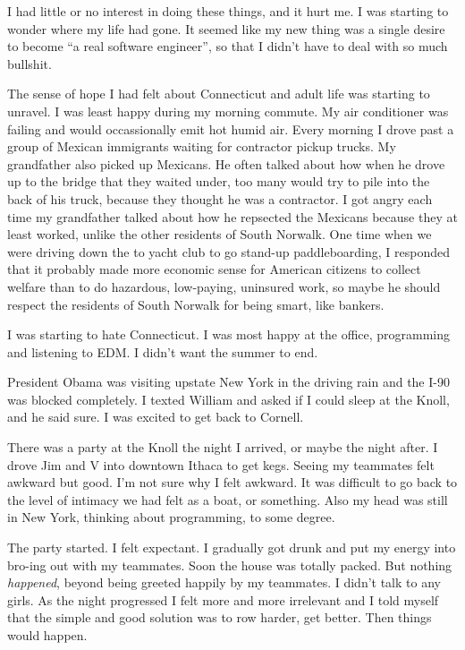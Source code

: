 \documentclass[12pt]{article}
\begin{document}
I had little or no interest in doing these things, and it hurt me.  I was
starting to wonder where my life had gone.  It seemed like my new thing was
a single desire to become ``a real software engineer'', so that I didn't have to
deal with so much bullshit.  

The sense of hope I had felt about Connecticut and adult life was starting to
unravel.  I was least happy during my morning commute.  My air conditioner was
failing and would occassionally emit hot humid air.  Every morning I drove past
a group of Mexican immigrants waiting for contractor pickup trucks.  My
grandfather also picked up Mexicans.  He often talked about how when he drove up
to the bridge that they waited under, too many would try to pile into the back
of his truck, because they thought he was a contractor.  I got angry each time
my grandfather talked about how he repsected the Mexicans because they at least
worked, unlike the other residents of South Norwalk.  One time when we were
driving down the to yacht club to go stand-up paddleboarding, I responded that
it probably made more economic sense for American citizens to collect welfare
than to do hazardous, low-paying, uninsured work, so maybe he should respect the
residents of South Norwalk for being smart, like bankers. 

I was starting to hate Connecticut.  I was most happy at the office, programming
and listening to EDM.  I didn't want the summer to end.

President Obama was visiting upstate New York in the driving rain and the I-90
was blocked completely.  I texted William and asked if I could sleep at the
Knoll, and he said sure.  I was excited to get back to Cornell.

There was a party at the Knoll the night I arrived, or maybe the night after.  I
drove Jim and V into downtown Ithaca to get kegs.  Seeing my teammates felt
awkward but good.  I'm not sure why I felt awkward.  It was difficult to go back
to the level of intimacy we had felt as a boat, or something.  Also my head was
still in New York, thinking about programming, to some degree.    

The party started.  I felt expectant.  I gradually got drunk and put my energy
into bro-ing out with my teammates.  Soon the house was totally packed.  But
nothing \textit{happened}, beyond being greeted happily by my teammates.  I
didn't talk to any girls.  As the night progressed I felt more and more
irrelevant and I told myself that the simple and good solution was to row
harder, get better.  Then things would happen.
\end{document}
